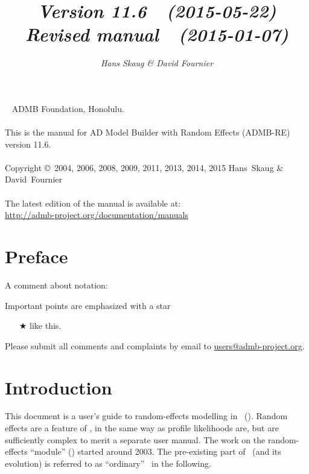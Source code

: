\documentclass{admbmanual}
\newcommand\admbversion{11.6}
\begin{document}
\title{%
  \vspace{4.5ex}\textsf{\textit{Version \admbversion~~(2015-05-22)\\[3pt]
      Revised manual~~(2015-01-07)
    }}\vspace{3ex}
}
\author{\textsf{\textit{Hans Skaug \& David Fournier}}}

\maketitle

~\vfill
\noindent ADMB Foundation, Honolulu.\\\\
\noindent This is the manual for AD Model Builder with Random Effects (ADMB-RE)
version \admbversion.\\\\
\noindent Copyright \copyright\ 2004, 2006, 2008, 2009, 2011, 2013, 2014, 2015
Hans~Skaug \& David~Fournier\\\\
\noindent The latest edition of the manual is available at:\\
\url{http://admb-project.org/documentation/manuals}

\tableofcontents

\chapter*{Preface}

A comment about notation:

Important points are emphasized with a star
\begin{itemize}
  \item[$\bigstar$] like this.
\end{itemize}

Please submit all comments and complaints by email to
\href{mailto:users@admb-project.org}{users@admb-project.org}.

\chapter{Introduction}

This document is a user's guide to random-effects modelling in \ADM\ (\scAB).
Random effects are a feature of \scAB, in the same way as profile likelihoods
are, but are sufficiently complex to merit a separate user manual. The work on
the random-effects ``module'' (\scAR) started around 2003. The pre-existing part
of \scAB\ (and its evolution) is referred to as ``ordinary'' \scAB\ in the
following.
\end{document}
